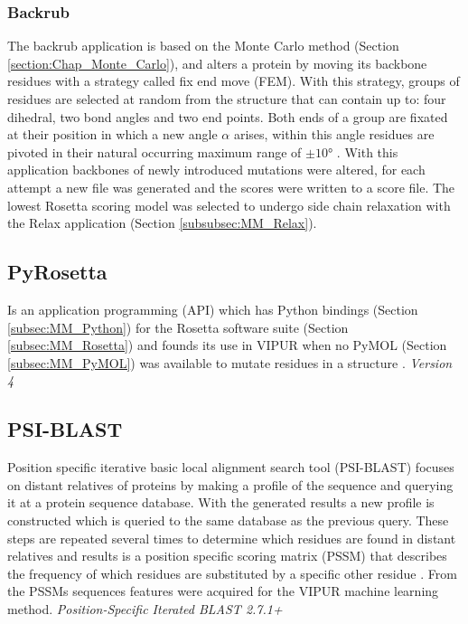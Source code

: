 \subsubsection{Backrub}
The backrub application is based on the Monte Carlo method (Section \ref{section:Chap_Monte_Carlo}), and alters a protein by moving its backbone residues with a strategy called fix end move (FEM). 
With this strategy, groups of residues are selected at random from the structure that can contain up to: four dihedral, two bond angles and two end points. 
Both ends of a group are fixated at their position in which a new angle $\alpha$ arises, within this angle residues are pivoted in their natural occurring maximum range of $\pm \ang{10}$ \cite{betancourt_efficient_2005, smith_backrub_nodate}.
With this application backbones of newly introduced mutations were altered, for each attempt a new file was generated and the scores were written to a score file. The lowest Rosetta scoring model was selected to undergo side chain relaxation with the Relax application (Section \ref{subsubsec:MM_Relax}).
\label{subsubsec:MM_Backrub}

\subsection{PyRosetta}
Is an application programming (API) which has Python bindings (Section \ref{subsec:MM_Python}) for the Rosetta software suite (Section \ref{subsec:MM_Rosetta}) and founds its use in VIPUR when no PyMOL (Section \ref{subsec:MM_PyMOL}) was available to mutate residues in a structure \cite{jeffrey_pyrosetta_nodate}.
\label{subsec:MM_PyRosetta}
\newline
\textit{Version 4}

\subsection{PSI-BLAST}
Position specific iterative basic local alignment search tool (PSI-BLAST) focuses on distant relatives of proteins by making a profile of the sequence and querying it at a protein sequence database. With the generated results a new profile is constructed which is queried to the same database as the previous query. These steps are repeated several times to determine which residues are found in distant relatives and results is a position specific scoring matrix (PSSM) that describes the frequency of which residues are substituted by a specific other residue \cite{ncbi_psiblast_nodate,ncbi_pssm_nodate,wikipedia_blast_2019}.
From the PSSMs sequences features were acquired for the VIPUR machine learning method.
\label{subsec:MM_PSI_BLAST}
\newline
\textit{Position-Specific Iterated BLAST 2.7.1+}

